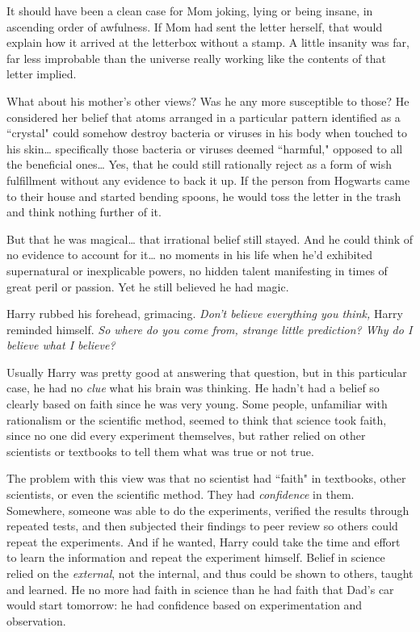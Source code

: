 It should have been a clean case for Mom joking, lying or being insane, in ascending order of awfulness. If Mom had sent the letter herself, that would explain how it arrived at the letterbox without a stamp. A little insanity was far, far less improbable than the universe really working like the contents of that letter implied.

What about his mother's other views? Was he any more susceptible to those? He considered her belief that atoms arranged in a particular pattern identified as a ``crystal" could somehow destroy bacteria or viruses in his body when touched to his skin{\ldots} specifically those bacteria or viruses deemed ``harmful," opposed to all the beneficial ones{\ldots} Yes, that he could still rationally reject as a form of wish fulfillment without any evidence to back it up. If the person from Hogwarts came to their house and started bending spoons, he would toss the letter in the trash and think nothing further of it.

But that he was magical{\ldots} that irrational belief still stayed. And he could think of no evidence to account for it{\ldots} no moments in his life when he'd exhibited supernatural or inexplicable powers, no hidden talent manifesting in times of great peril or passion. Yet he still believed he had magic.

Harry rubbed his forehead, grimacing. \emph{Don't believe everything you think,} Harry reminded himself. \emph{So where do you come from, strange little prediction? Why do I believe what I believe?}

Usually Harry was pretty good at answering that question, but in this particular case, he had no \emph{clue} what his brain was thinking. He hadn't had a belief so clearly based on faith since he was very young. Some people, unfamiliar with rationalism or the scientific method, seemed to think that science took faith, since no one did every experiment themselves, but rather relied on other scientists or textbooks to tell them what was true or not true.

The problem with this view was that no scientist had ``faith" in textbooks, other scientists, or even the scientific method. They had \emph{confidence} in them. Somewhere, someone was able to do the experiments, verified the results through repeated tests, and then subjected their findings to peer review so others could repeat the experiments. And if he wanted, Harry could take the time and effort to learn the information and repeat the experiment himself. Belief in science relied on the \emph{external}, not the internal, and thus could be shown to others, taught and learned. He no more had faith in science than he had faith that Dad's car would start tomorrow: he had confidence based on experimentation and observation.


